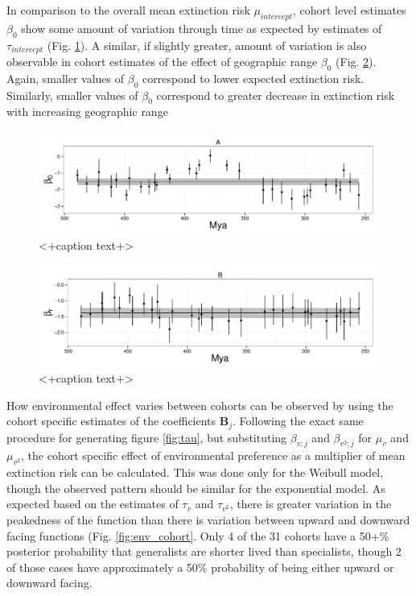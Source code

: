 \documentclass[12pt,letterpaper]{article}
\begin{document}
In comparison to the overall mean extinction risk \(\mu_{intercept}\), cohort level estimates \(\beta_{0}\) show some amount of variation through time as expected by estimates of \(\tau_{intercept}\) (Fig. \ref{fig:cohort_intercept}). A similar, if slightly greater, amount of variation is also observable in cohort estimates of the effect of geographic range \(\beta_{0}\) (Fig. \ref{fig:cohort_range}). Again, smaller values of \(\beta_{0}\) correspond to lower expected extinction risk. Similarly, smaller values of \(\beta_{0}\) correspond to greater decrease in extinction risk with increasing geographic range 
\begin{figure}[ht]
  \centering
  \includegraphics[height = 0.5\textheight,width=\textwidth,keepaspectratio=true]{figure/intercept_cohort}
  \caption{<+caption text+>}
  \label{fig:cohort_intercept}
\end{figure}

\begin{figure}[ht]
  \centering
  \includegraphics[height = 0.5\textheight,width=\textwidth,keepaspectratio=true]{figure/range_cohort}
  \caption{<+caption text+>}
  \label{fig:cohort_range}
\end{figure}

How environmental effect varies between cohorts can be observed by using the cohort specific estimates of the coefficients \(\mathbf{B}_{j}\). Following the exact same procedure for generating figure \ref{fig:tau}, but substituting \(\beta_{v; j}\) and \(\beta_{v^{2}; j}\) for \(\mu_{v}\) and \(\mu_{v^{2}}\), the cohort specific effect of environmental preference as a multiplier of mean extinction risk can be calculated. This was done only for the Weibull model, though the observed pattern should be similar for the exponential model. As expected based on the estimates of \(\tau_{v}\) and \(\tau_{v^{2}}\), there is greater variation in the peakedness of the function than there is variation between upward and downward facing functions (Fig. \ref{fig:env_cohort}. Only 4 of the 31 cohorts have a 50+\% posterior probability that generalists are shorter lived than specialists, though 2 of those cases have approximately a 50\% probability of being either upward or downward facing.
\end{document}

